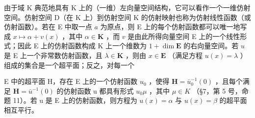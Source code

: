 由于域 K 典范地具有 K 上的（一维）左向量空间结构，它可以看作一个一维仿射空间。仿射空间 D（在 K 上）到仿射空间 K 的仿射映射也称为仿射线性函数（或仿射函数）。若在 E 中取一点 \(a\) 为原点，则 E 上的每个仿射函数都可以唯一地写成 \(x \mapsto \alpha + v(x)\) ，其中 \(\alpha \in \mathbf{K}\) ，而 \(v\) 是由此所得向量空间 E 上的一个线性形式；因此 E 上的仿射函数构成 K 上一个维数为 \(1 + \dim \mathbf{E}\) 的右向量空间。若 \(u\) 是 E 上一个非常数仿射函数，且 \(\lambda \in \mathbf{K}\) ，则由 \(x \in \mathbf{E}\) （满足方程 \(u(x) = \lambda\) ）组成的集合是一个超平面；反之，对每一个

E 中的超平面 H，存在 E 上的一个仿射函数 \(u_{0}\) ，使得 \(\mathbf{H} = \bar{u}_{0}^{-1}(0)\) ，且每个满足 \(\mathbf{H} = \bar{u}^{-1}(0)\) 的仿射函数 u 都具有形式 \(u_{0}\mu\) ，其中 \(\mu \in K\) （§7，第 5 号，命题 11）。若 u 是 E 上的仿射函数，则方程为 \(u(x) = \alpha\) 与 \(u(x) = \beta\) 的超平面相互平行。

